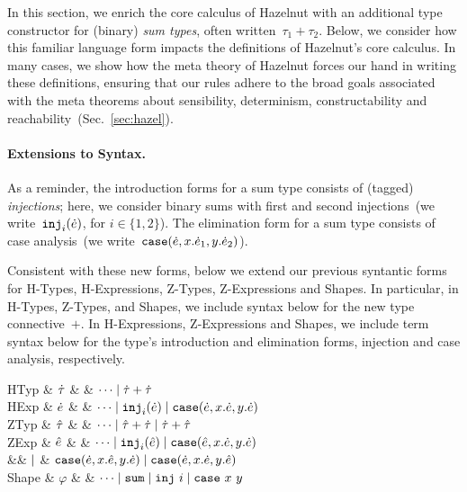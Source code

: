 \renewcommand{\thesumtypedef}{\theequation\alph{sumtypedef}}

\newcommand{\Define}[1]{(\refstepcounter{sumtypedef}\thesumtypedef\label{#1})}

In this section, we enrich the core calculus of Hazelnut with an
additional type constructor for (binary) \emph{sum types}, often
written~$\tau_1 + \tau_2$.
%
Below, we consider how this familiar language form impacts the
definitions of Hazelnut's core calculus.
%
In many cases, we show how the meta theory of Hazelnut forces our hand
in writing these definitions, ensuring that our rules adhere to the
broad goals associated with the meta theorems about sensibility,
determinism, constructability and reachability~(Sec.~\ref{sec:hazel}).

\paragraph{Extensions to Syntax.} 
%
As a reminder, the introduction forms for a sum type consists of
(tagged) \emph{injections}; here, we consider binary sums with first
and second injections~(we write~$\texttt{inj}_{i}({\dot{e}})$, for
$i\in\{1,2\}$). The elimination form for a sum type consists of case
analysis~(we write~$\texttt{case}({\dot{e}},{x}.{\dot{e}_1},{y}.{\dot{e}_2})$).

Consistent with these new forms, below we extend our previous
syntantic forms for H-Types, H-Expressions, Z-Types, Z-Expressions and
Shapes.
%
In particular, in H-Types, Z-Types, and Shapes, we include syntax
below for the new type connective~$+$.
%
In H-Expressions, Z-Expressions and Shapes, we include term syntax
below for the type's introduction and elimination forms, injection and
case analysis, respectively.

\begin{grammar}
\textsf{HTyp} & $\dot{\tau}$ & \bnfas & $\cdots \mathrel{\mid} {\dot{\tau}} + {\dot{\tau}}$
\\
\textsf{HExp} & $\dot{e}$ & \bnfas & $\cdots 
\mathrel{\mid} \texttt{inj}_{i}({\dot{e}})
\mathrel{\mid} \texttt{case}({\dot{e}},{x}.{\dot{e}},{y}.{\dot{e}})$
\\[2mm]
\textsf{ZTyp} & $\hat{\tau}$ & \bnfas & $\cdots \mathrel{\mid} {\hat{\tau}} + {\dot{\tau}} \mathrel{\mid} {\dot{\tau}} + {\hat{\tau}}$
\\
\textsf{ZExp} & $\hat{e}$ & \bnfas & $\cdots
\mathrel{\mid} \texttt{inj}_{i}({\hat{e}})
\mathrel{\mid} \texttt{case}({\hat{e}},{x}.{\dot{e}},{y}.{\dot{e}})$
\\
&& $\mathrel{\mid}$ & $\texttt{case}({\dot{e}},{x}.{\hat{e}},{y}.{\dot{e}})
\mathrel{\mid}\texttt{case}({\dot{e}},{x}.{\dot{e}},{y}.{\hat{e}})$
\\[2mm]
\textsf{Shape} & $\varphi$ & \bnfas & $\cdots \mathrel{\mid} \mathtt{sum} \mathrel{\mid} \mathtt{inj}~i \mathrel{\mid} \mathtt{case}~x~y$
\end{grammar}

